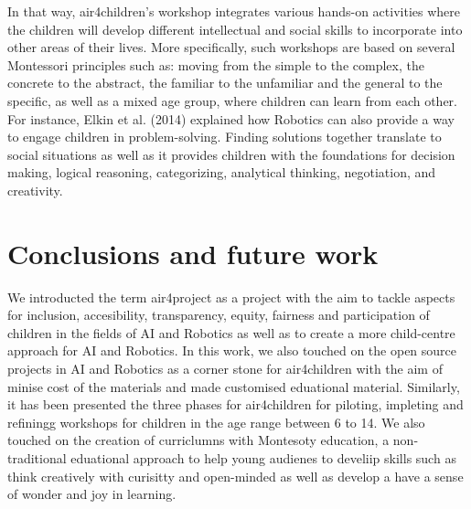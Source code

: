 \documentclass[sigconf]{acmart}
\begin{document}
In that way, air4children's workshop integrates various hands-on activities where the children will develop different intellectual and social skills to incorporate into other areas of their lives.
More specifically, such workshops are based on several Montessori principles such as: moving from the simple to the complex, the concrete to the abstract, the familiar to the unfamiliar and the general to the specific, as well as a mixed age group, where children can learn from each other.
For instance, Elkin et al. (2014) \cite{elkin2014} explained how Robotics can also provide a way to engage children in problem-solving. 
Finding solutions together translate to social situations as well as it provides children with the foundations for decision making, logical reasoning, categorizing, analytical thinking, negotiation, and creativity. 



\section{Conclusions and future work}
We introducted the term air4project as a project with the aim to tackle aspects for inclusion, accesibility, transparency, equity, fairness and participation of children in the fields of AI and Robotics as well as to create a more child-centre approach for AI and Robotics.
In this work, we also touched on the open source projects in AI and Robotics as a corner stone for air4children with the aim of minise cost of the materials and made customised eduational material.  
Similarly, it has been presented the three phases for air4children for piloting, impleting and refiningg workshops for children in the age range between 6 to 14. 
We also touched on the creation of curriclumns with Montesoty education, a non-traditional eduational approach to help young audienes to develiip skills such as think creatively with curisitty and open-minded as well as develop a have a sense of wonder and joy in learning.
\end{document}
